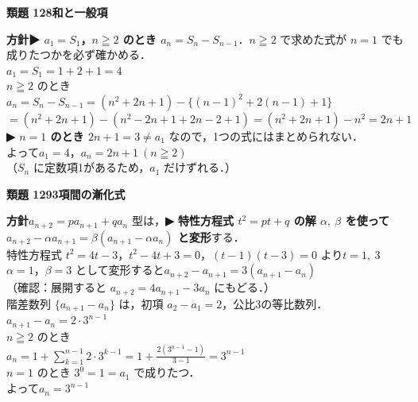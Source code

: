 \documentclass[a4paper,11pt]{ltjsarticle}
\newcommand{\ans}[2]{\Needspace{5\baselineskip}\vspace{6pt}%
  {\sffamily\bfseries 類題 #1\quad #2}\par}
\newcommand{\point}[1]{\textsf{\bfseries ▶ #1}}
\begin{document}
\ans{128}{和と一般項}
\begin{kai}
\textbf{方針}\quad \point{$a_1=S_1$，$n\geqq2$ のとき $a_n=S_n-S_{n-1}$}．$n\geqq2$ で求めた式が $n=1$ でも成りたつかを必ず確かめる．\\[2pt]
$a_1=S_1=1+2+1=4$\\[2pt]
$n\geqq2$ のとき\\
\hspace*{1.5em}$a_n=S_n-S_{n-1}=(n^2+2n+1)-\{(n-1)^2+2(n-1)+1\}$\\
\hspace*{1.5em}$=(n^2+2n+1)-(n^2-2n+1+2n-2+1)=(n^2+2n+1)-n^2=2n+1$\\[2pt]
\point{$n=1$ のとき $2n+1=3\neq a_1$} なので，1つの式にはまとめられない．\\
よって\quad $a_1=4$，\quad $a_n=2n+1\ (n\geqq2)$\\
（$S_n$ に定数項1があるため，$a_1$ だけずれる．）
\end{kai}

\ans{129}{3項間の漸化式}
\begin{kai}
\textbf{方針}\quad $a_{n+2}=pa_{n+1}+qa_n$ 型は，\point{特性方程式 $t^2=pt+q$ の解 $\alpha,\ \beta$ を使って $a_{n+2}-\alpha a_{n+1}=\beta(a_{n+1}-\alpha a_n)$ と変形}する．\\[2pt]
特性方程式 $t^2=4t-3$，$t^2-4t+3=0$，$(t-1)(t-3)=0$ より\quad $t=1,\ 3$\\
$\alpha=1$，$\beta=3$ として変形すると\quad $a_{n+2}-a_{n+1}=3(a_{n+1}-a_n)$\\
（確認：展開すると $a_{n+2}=4a_{n+1}-3a_n$ にもどる．）\\[2pt]
階差数列 $\{a_{n+1}-a_n\}$ は，初項 $a_2-a_1=2$，公比3の等比数列．\\
\hspace*{1.5em}$a_{n+1}-a_n=2\cdot3^{n-1}$\\
$n\geqq2$ のとき\\
\hspace*{1.5em}$a_n=1+\displaystyle\sum_{k=1}^{n-1}2\cdot3^{k-1}=1+\frac{2(3^{n-1}-1)}{3-1}=3^{n-1}$\\
$n=1$ のとき $3^0=1=a_1$ で成りたつ．\\[2pt]
よって\quad $a_n=3^{n-1}$
\end{kai}
\end{document}
